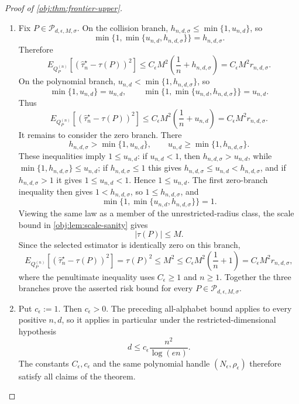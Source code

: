 \documentclass[11pt]{article}
\begin{document}
\begin{proof}[Proof of \cref{obj:thm:frontier-upper}]
\begin{enumerate}
\item Fix \(P\in\mathcal P_{d,\epsilon,M,\sigma}\).  On the collision branch,
\(h_{n,d,\sigma}\le \min\{1,u_{n,d}\}\), so
\[
\min\{1,\min\{u_{n,d},h_{n,d,\sigma}\}\}=h_{n,d,\sigma}.
\]
Therefore
\[
E_{Q_P^{(n)}}\!\left[
\left(\widehat\tau_n^{\star}-\tau(P)\right)^2
\right]
\le
C_{\epsilon}M^2\left(\frac1n+h_{n,d,\sigma}\right)
=
C_{\epsilon}M^2 r_{n,d,\sigma}.
\]
On the polynomial branch, \(u_{n,d}<\min\{1,h_{n,d,\sigma}\}\), so
\[
\min\{1,u_{n,d}\}=u_{n,d},
\qquad
\min\{1,\min\{u_{n,d},h_{n,d,\sigma}\}\}=u_{n,d}.
\]
Thus
\[
E_{Q_P^{(n)}}\!\left[
\left(\widehat\tau_n^{\star}-\tau(P)\right)^2
\right]
\le
C_{\epsilon}M^2\left(\frac1n+u_{n,d}\right)
=
C_{\epsilon}M^2 r_{n,d,\sigma}.
\]
It remains to consider the zero branch.  There
\[
h_{n,d,\sigma}> \min\{1,u_{n,d}\},
\qquad
u_{n,d}\ge \min\{1,h_{n,d,\sigma}\}.
\]
These inequalities imply \(1\le u_{n,d}\): if \(u_{n,d}<1\), then
\(h_{n,d,\sigma}>u_{n,d}\), while
\(\min\{1,h_{n,d,\sigma}\}\le u_{n,d}\); if \(h_{n,d,\sigma}\le1\) this gives
\(h_{n,d,\sigma}\le u_{n,d}<h_{n,d,\sigma}\), and if \(h_{n,d,\sigma}>1\) it
gives \(1\le u_{n,d}<1\).  Hence \(1\le u_{n,d}\).  The first zero-branch
inequality then gives \(1<h_{n,d,\sigma}\), so \(1\le h_{n,d,\sigma}\), and
\[
\min\{1,\min\{u_{n,d},h_{n,d,\sigma}\}\}=1.
\]
Viewing the same law as a member of the unrestricted-radius class, the scale
bound in \cref{obj:lem:scale-sanity} gives
\[
|\tau(P)|\le M.
\]
Since the selected estimator is identically zero on this branch,
\[
E_{Q_P^{(n)}}\!\left[
\left(\widehat\tau_n^{\star}-\tau(P)\right)^2
\right]
=
\tau(P)^2
\le M^2
\le C_{\epsilon}M^2\left(\frac1n+1\right)
=
C_{\epsilon}M^2 r_{n,d,\sigma},
\]
where the penultimate inequality uses \(C_{\epsilon}\ge1\) and \(n\ge1\).
Together the three branches prove the asserted risk bound for every
\(P\in\mathcal P_{d,\epsilon,M,\sigma}\). %

\item Put \(c_{\epsilon}:=1\).  Then \(c_{\epsilon}>0\).  The preceding
all-alphabet bound applies to every positive \(n,d\), so it applies in
particular under the restricted-dimensional hypothesis
\[
d\le c_{\epsilon}\frac{n^2}{\log(en)}.
\]
The constants \(C_{\epsilon},c_{\epsilon}\) and the same polynomial handle
\((N_{\epsilon},\rho_{\epsilon})\) therefore satisfy all claims of the theorem.
\end{enumerate}
\end{proof}
\end{document}
